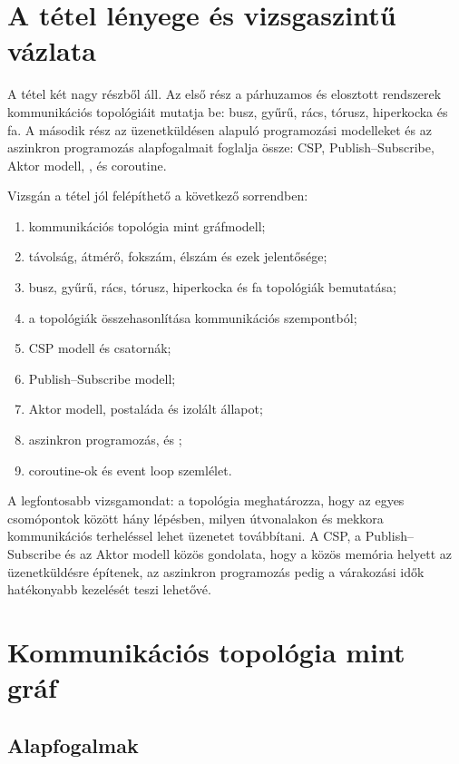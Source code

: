 \section{A tétel lényege és vizsgaszintű vázlata}

\begin{summarybox}
A tétel két nagy részből áll. Az első rész a párhuzamos és elosztott rendszerek kommunikációs topológiáit mutatja be: busz, gyűrű, rács, tórusz, hiperkocka és fa. A második rész az üzenetküldésen alapuló programozási modelleket és az aszinkron programozás alapfogalmait foglalja össze: CSP, Publish--Subscribe, Aktor modell, ,  és coroutine.
\end{summarybox}

Vizsgán a tétel jól felépíthető a következő sorrendben:

\begin{enumerate}
  \item kommunikációs topológia mint gráfmodell;
  \item távolság, átmérő, fokszám, élszám és ezek jelentősége;
  \item busz, gyűrű, rács, tórusz, hiperkocka és fa topológiák bemutatása;
  \item a topológiák összehasonlítása kommunikációs szempontból;
  \item CSP modell és csatornák;
  \item Publish--Subscribe modell;
  \item Aktor modell, postaláda és izolált állapot;
  \item aszinkron programozás,  és ;
  \item coroutine-ok és event loop szemlélet.
\end{enumerate}

A legfontosabb vizsgamondat: a topológia meghatározza, hogy az egyes csomópontok között hány lépésben, milyen útvonalakon és mekkora kommunikációs terheléssel lehet üzenetet továbbítani. A CSP, a Publish--Subscribe és az Aktor modell közös gondolata, hogy a közös memória helyett az üzenetküldésre építenek, az aszinkron programozás pedig a várakozási idők hatékonyabb kezelését teszi lehetővé.

\section{Kommunikációs topológia mint gráf}

\subsection{Alapfogalmak}

